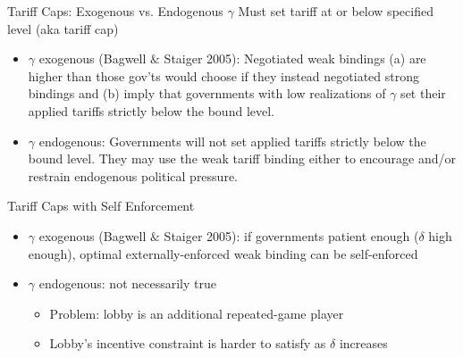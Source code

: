 \documentclass[handout]{beamer}
\newcommand{\bta}{\bm{\tau^a}}
\newcommand{\btn}{\bm{\tau^{tw}}}
\newcommand{\ga}{\gamma}
\newcommand{\de}{\delta}
\begin{document}
{\begin{frame}{Tariff Caps: Exogenous vs. Endogenous $\ga$}
\pause
Must set tariff at or below specified level (aka tariff cap)
\pause
\begin{itemize}[<+->]
	\item $\ga$ exogenous (Bagwell $\&$ Staiger 2005): Negotiated weak bindings (a) are higher than those gov'ts would choose if they instead negotiated strong bindings and (b) imply that governments with low realizations of $\ga$ set their applied tariffs strictly below the bound level.

	\item $\ga$ endogenous: Governments will not set applied tariffs strictly below the bound level. They may use the weak tariff binding either to encourage and/or restrain endogenous political pressure.

\end{itemize}
\end{frame}


\begin{frame}{Tariff Caps with Self Enforcement}
\pause
\begin{itemize}[<+->]
	\item $\ga$ exogenous (Bagwell $\&$ Staiger 2005): if governments patient enough ($\de$ high enough), optimal externally-enforced weak binding can be self-enforced
  \item $\ga$ endogenous: not necessarily true
		\begin{itemize}
			\item Problem: lobby is an additional repeated-game player
			\item Lobby's incentive constraint is harder to satisfy as $\de$ increases
		\end{itemize}
	 
\end{itemize}

\end{frame}




}
\end{document}
